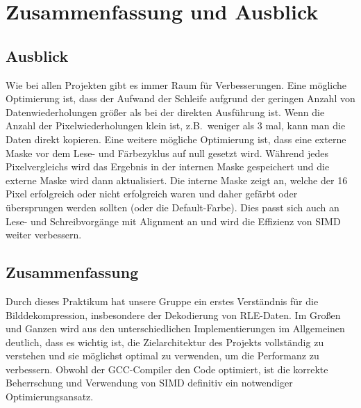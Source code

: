 \documentclass[course=erap]{aspdoc}
\begin{document}
    \section{Zusammenfassung und Ausblick}\label{sec:zusammenfassung-und-ausblick}

    \subsection{Ausblick}\label{subsec:ausblick}
    Wie bei allen Projekten gibt es immer Raum für Verbesserungen.
    \newline
    \newline
    Eine mögliche Optimierung ist, dass der Aufwand der Schleife aufgrund der geringen Anzahl von
    Datenwiederholungen größer als bei der direkten Ausführung ist.
    Wenn die Anzahl der Pixelwiederholungen klein ist, z.B.\ weniger als 3 mal, kann man die Daten direkt kopieren.
    \newline
    \newline
    Eine weitere mögliche Optimierung ist, dass eine externe Maske vor dem Lese- und Färbezyklus auf null gesetzt wird.
    Während jedes Pixelvergleichs wird das Ergebnis in der internen Maske gespeichert und die externe Maske wird
    dann aktualisiert.
    Die interne Maske zeigt an, welche der 16 Pixel erfolgreich oder nicht erfolgreich waren und daher gefärbt
    oder übersprungen werden sollten (oder die Default-Farbe).
    \newline
    \newline
    Dies passt sich auch an Lese- und Schreibvorgänge mit Alignment an und wird die Effizienz von SIMD
    weiter verbessern.

    \subsection{Zusammenfassung}\label{subsec:zusammenfassung}
    Durch dieses Praktikum hat unsere Gruppe ein erstes Verständnis für die Bilddekompression, insbesondere der
    Dekodierung von RLE-Daten.
    \newline
    \newline
    Im Großen und Ganzen wird aus den unterschiedlichen Implementierungen im Allgemeinen deutlich, dass es wichtig ist,
    die Zielarchitektur des Projekts vollständig zu verstehen und sie möglichst optimal zu verwenden, um die
    Performanz zu verbessern.
    \newline
    Obwohl der GCC-Compiler den Code optimiert, ist die korrekte Beherrschung und Verwendung von SIMD definitiv ein
    notwendiger Optimierungsansatz.
    \newpage


    
    
\end{document}
